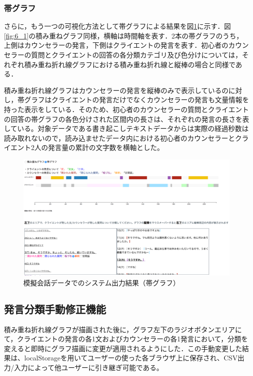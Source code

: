 \documentclass[shuuron]{kuee}
\begin{document}
\subsubsection{帯グラフ}

さらに，もう一つの可視化方法として帯グラフによる結果を図\ref{fig:obi}に示す．図\ref{fig:6_1}の積み重ねグラフ同様，横軸は時間軸を表す．2本の帯グラフのうち，上側はカウンセラーの発言，下側はクライエントの発言を表す．初心者のカウンセラーの質問とクライエントの回答の各分類カテゴリ及び色分けについては，それぞれ積み重ね折れ線グラフにおける積み重ね折れ線と縦棒の場合と同様である．

積み重ね折れ線グラフはカウンセラーの発言を縦棒のみで表示しているのに対し，帯グラフはクライエントの発言だけでなくカウンセラーの発言も文量情報を持った表示をしている．そのため、初心者のカウンセラーの質問とクライエントの回答の帯グラフの各色分けされた区間内の長さは、それぞれの発言の長さを表している。対象データである書き起こしテキストデータからは実際の経過秒数は読み取れないので，読み込ませたデータ内における初心者のカウンセラーとクライエント2人の発言量の累計の文字数を横軸とした。

\begin{figure}
  \begin{center}
    \includegraphics[width=\linewidth]{obi.png}
  \end{center}
  \caption{模擬会話データでのシステム出力結果（帯グラフ）}
  \label{fig:obi}
\end{figure}

\subsection{発言分類手動修正機能}
積み重ね折れ線グラフが描画された後に，グラフ左下のラジオボタンエリアにて，クライエントの発言の各1文およびカウンセラーの各1発言において，分類を変えると即時にグラフ描画に変更が適用されるようにした．この手動変更した結果は、localStorageを用いてユーザーの使った各ブラウザ上に保存され、CSV出力/入力によって他ユーザーに引き継ぎ可能である。
\end{document}
